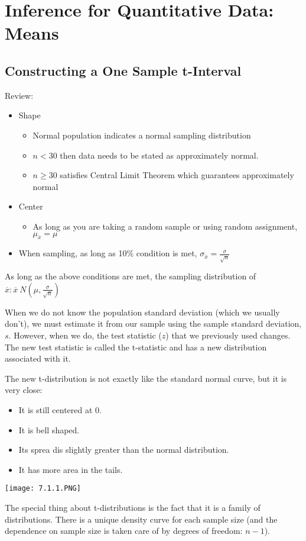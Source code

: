 \documentclass[../stats.tex]{subfiles}
\begin{document}
\chapter{Inference for Quantitative Data: Means}
\section{Constructing a One Sample t-Interval}
Review:
\begin{itemize}
    \item Shape 
    \begin{itemize}
        \item Normal population indicates a normal sampling distribution 
        \item $n<30$ then data needs to be stated as approximately normal.
        \item $n\geq 30$ satisfies Central Limit Theorem which guarantees approximately normal 
    \end{itemize}
    \item Center 
    \begin{itemize}
        \item As long as you are taking a random sample or using random assignment, $\mu_{\overline{x}}=\mu$
    \end{itemize}
    \item When sampling, as long as 10\% condition is met, $\sigma_{\overline{x}}=\frac{\sigma}{\sqrt{n}}$
\end{itemize}

As long as the above conditions are met, the sampling distribution of $\overline{x}: \overline{x}~N\left(\mu,\frac{\sigma}{\sqrt{n}}\right)$

When we do not know the population standard deviation (which we usually don't), we must estimate it from our sample using the sample standard deviation, $s$. However, when we do, the test 
statistic ($z$) that we previously used changes. The new test statistic is called the t-statistic and has a new distribution associated with it.

The new t-distribution is not exactly like the standard normal curve, but it is very close:
\begin{itemize}
    \item It is still centered at 0.
    \item It is bell shaped.
    \item Its sprea dis slightly greater than the normal distribution.
    \item It has more area in the tails.
\end{itemize}
\begin{center}
    \texttt{[image: 7.1.1.PNG]}
\end{center}
The special thing about t-distributions is the fact that it is a family of distributions. There is a unique density curve for each sample size (and the dependence on sample size is taken care of by degrees of freedom: $n-1$).
\end{document}

